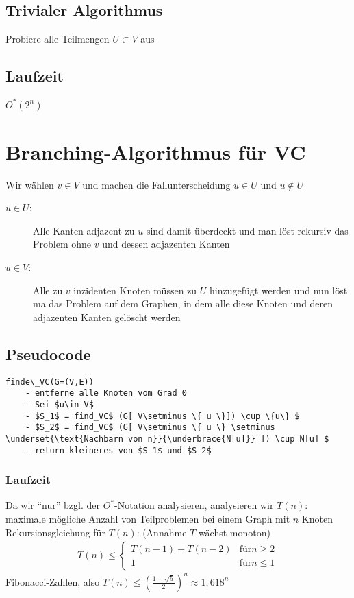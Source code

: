 \subsection{Trivialer Algorithmus}
Probiere alle Teilmengen $U\subset V$ aus
\subsection{Laufzeit}
$O^*(2^n)$
\section{Branching-Algorithmus für VC}
Wir wählen $v\in V$ und machen die Fallunterscheidung $u\in U$ und $u \notin U$
\begin{description}
	\item[\textbullet $u\in U$:] Alle Kanten adjazent zu $u$ sind damit überdeckt und man löst rekursiv das Problem ohne $v$ und dessen adjazenten Kanten
	\item[\textbullet $u\in V$:] Alle zu $v$ inzidenten Knoten müssen zu $U$ hinzugefügt werden und nun löst ma das Problem auf dem Graphen, in dem alle diese Knoten und deren adjazenten Kanten gelöscht werden
\end{description}
\subsection{Pseudocode}
\begin{lstlisting}
finde\_VC(G=(V,E))
	- entferne alle Knoten vom Grad 0
	- Sei $u\in V$
	- $S_1$ = find_VC$ (G[ V\setminus \{ u \}]) \cup \{u\} $
	- $S_2$ = find_VC$ (G[ V\setminus \{ u \} \setminus \underset{\text{Nachbarn von n}}{\underbrace{N[u]}} ]) \cup N[u] $
	- return kleineres von $S_1$ und $S_2$  
\end{lstlisting}
\subsubsection{Laufzeit}
Da wir "`nur"' bzgl. der $O^*$-Notation analysieren, analysieren wir $T(n):$ maximale mögliche Anzahl von Teilproblemen bei einem Graph mit $n$ Knoten\\
Rekursionsgleichung für $T(n)$: (Annahme $T$ wächst monoton)
\begin{align*}
T(n) \leq \begin{cases}
T(n-1) + T(n-2)& \text{für} n\geq 2\\
1 & \text{für} n \leq 1
\end{cases}
\end{align*}
Fibonacci-Zahlen, also $T(n) \leq \left( \frac{1 + \sqrt{5}}{2} \right)^n \approx 1,618^n$
